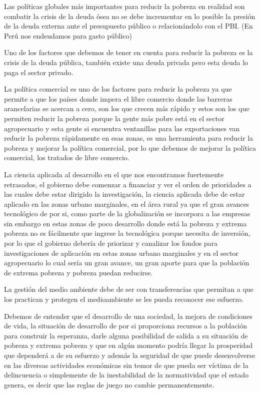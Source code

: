\documentclass[
  a4paper,
]{article}
\begin{document}
Las políticas globales más importantes para reducir la pobreza en
realidad son combatir la crisis de la deuda ósea no se debe incrementar
en lo posible la presión de la deuda externa ante el presupuesto público
o relacionándolo con el PBI. (En Perú nos endeudamos para gasto público)

Uno de los factores que debemos de tener en cuenta para reducir la
pobreza es la crisis de la deuda pública, también existe una deuda
privada pero esta deuda lo paga el sector privado.

La política comercial es uno de los factores para reducir la pobreza ya
que permite a que los países donde impera el libre comercio donde las
barreras arancelarias se acercan a cero, son los que crecen más rápido y
estos son los que permiten reducir la pobreza porque la gente más pobre
está en el sector agropecuario y esta gente si encuentra ventanillas
para las exportaciones van reducir la pobreza rápidamente en esas zonas,
es una herramienta para reducir la pobreza y mejorar la política
comercial, por lo que debemos de mejorar la política comercial, los
tratados de libre comercio.

La ciencia aplicada al desarrollo en el que nos encontramos fuertemente
retrasados, el gobierno debe comenzar a financiar y ver el orden de
prioridades a las cuales debe estar dirigido la investigación, la
ciencia aplicada debe de estar aplicado en las zonas urbano marginales,
en el área rural ya que el gran avances tecnológico de por si, como
parte de la globalización se incorpora a las empresas sin embargo en
estas zonas de poco desarrollo donde está la pobreza y extrema pobreza
no es fácilmente que ingrese la tecnológica porque necesita de
inversión, por lo que el gobierno debería de priorizar y canalizar los
fondos para investigaciones de aplicación en estas zonas urbano
marginales y en el sector agropecuario lo cual sería un gran avance, un
gran aporte para que la población de extrema pobreza y pobreza puedan
reducirse.

La gestión del medio ambiente debe de ser con transferencias que
permitan a que los practican y protegen el medioambiente se les pueda
reconocer ese esfuerzo.

Debemos de entender que el desarrollo de una sociedad, la mejora de
condiciones de vida, la situación de desarrollo de por si proporciona
recursos a la población para construir la esperanza, darle alguna
posibilidad de salida a su situación de pobreza y extrema pobreza y que
en algún momento podría llegar la prosperidad que dependerá a de su
esfuerzo y además la seguridad de que puede desenvolverse en las
diversas actividades económicas sin temor de que pueda ser víctima de la
delincuencia o simplemente de la inestabilidad de la normatividad que el
estado genera, es decir que las reglas de juego no cambie
permanentemente.
\end{document}
